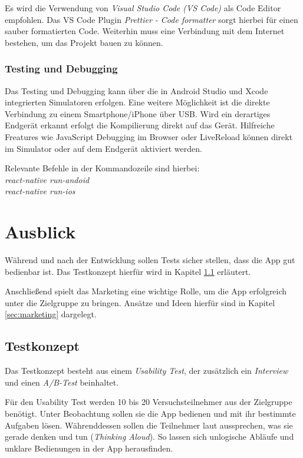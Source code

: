 Es wird die Verwendung von \emph{Visual Studio Code (VS Code)} als Code Editor empfohlen.
Das VS Code Plugin \emph{Prettier - Code formatter} sorgt hierbei für einen sauber formatierten Code. Weiterhin muss eine Verbindung mit dem Internet bestehen, um das Projekt bauen zu können.

\subsection{Testing und Debugging}
Das Testing und Debugging kann über die in Android Studio und Xcode integrierten Simulatoren erfolgen.
Eine weitere Möglichkeit ist die direkte Verbindung zu einem Smartphone/iPhone über USB.
Wird ein derartiges Endgerät erkannt erfolgt die Kompilierung direkt auf das Gerät.
Hilfreiche Freatures wie JavaScript Debugging im Browser oder LiveReload können direkt im Simulator oder auf dem Endgerät aktiviert werden.

Relevante Befehle in der Kommandozeile sind hierbei:\\
\emph{react-native run-andoid}\\
\emph{react-native run-ios}






\chapter{Ausblick}
\label{ausblick}
Während und nach der Entwicklung sollen Tests sicher stellen, dass die App gut bedienbar ist. Das Testkonzept hierfür wird in Kapitel \ref{sec:testkonzept} erläutert.

Anschließend spielt das Marketing eine wichtige Rolle, um die App erfolgreich unter die Zielgruppe zu bringen. Ansätze und Ideen hierfür sind in Kapitel \ref{sec:marketing} dargelegt.

\section{Testkonzept}
\label{sec:testkonzept}
Das Testkonzept besteht aus einem \emph{Usability Test}, der zusätzlich ein \emph{Interview} und einen \emph{A/B-Test} beinhaltet.

Für den Usability Test werden 10 bis 20  Versuchsteilnehmer aus der Zielgruppe benötigt. Unter Beobachtung sollen sie die App bedienen und mit ihr bestimmte Aufgaben lösen. Währenddessen sollen die Teilnehmer laut aussprechen, was sie gerade denken und tun (\emph{Thinking Aloud}). So lassen sich unlogische Abläufe und unklare Bedienungen in der App herausfinden.

